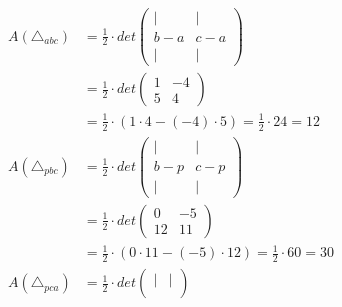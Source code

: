 \documentclass{article}
\begin{document}
\[
    \begin{aligned}
        A(\triangle_{abc}) & = \frac{1}{2} \cdot det \begin{pmatrix}
                                                         |   & |   \\
                                                         b-a & c-a \\
                                                         |   & |
                                                     \end{pmatrix}                                           \\
                           & = \frac{1}{2} \cdot det \begin{pmatrix}
                                                         1 & -4 \\
                                                         5 & 4
                                                     \end{pmatrix}                                           \\
                           & = \frac{1}{2} \cdot (1 \cdot 4 - (-4) \cdot 5) = \frac{1}{2} \cdot 24 = 12       \\
        A(\triangle_{pbc}) & = \frac{1}{2} \cdot det \begin{pmatrix}
                                                         |   & |   \\
                                                         b-p & c-p \\
                                                         |   & |
                                                     \end{pmatrix}                                           \\
                           & = \frac{1}{2} \cdot det \begin{pmatrix}
                                                         0  & -5 \\
                                                         12 & 11
                                                     \end{pmatrix}                                           \\
                           & = \frac{1}{2} \cdot (0 \cdot 11 - (-5) \cdot 12) = \frac{1}{2} \cdot 60 = 30     \\
        A(\triangle_{pca}) & = \frac{1}{2} \cdot det \begin{pmatrix}
                                                         |   & |   \\

\end{pmatrix}
\end{aligned}\]
\end{document}

